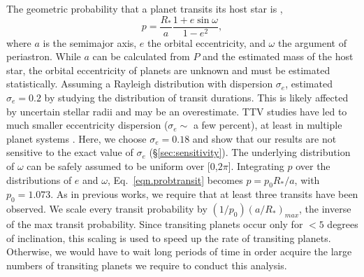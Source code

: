 The geometric probability that a planet transits its host star is
\citep{Winn},
\begin{equation}
\label{eqn.probtransit}
p = \frac{R_*}{a}\frac{1+e \sin \omega}{1-e^2},
\end{equation}
where $a$ is the semimajor axis, $e$ the orbital eccentricity, and
$\omega$ the argument of periastron.  While $a$ can be calculated from
$P$ and the estimated mass of the host star, the orbital eccentricity
of \kep{} planets are unknown and must be estimated statistically.
Assuming a Rayleigh distribution with
  dispersion $\sigma_e$, \citet{Moorhead2011} estimated $\sigma_e =
0.2$ by studying the distribution of transit durations. This
  is likely affected by uncertain stellar radii and may be an
  overestimate. TTV studies have led to much smaller eccentricity
  dispersion ($\sigma_e \sim$ a few percent), at least in multiple
  planet systems \citep{WuLithwick,HaddenLithwick}. Here, we choose
$\sigma_e = 0.18$ and show that our results are not sensitive to the
exact value of $\sigma_e$ (\S \ref{sec:sensitivity}). 
The underlying distribution of $\omega$ can be safely assumed to be
uniform over [0,$2\pi$].  
Integrating $p$ over the distributions of $e$ and $\omega$,
Eq.~\ref{eqn.probtransit} becomes $p = p_0 R_*/a$, with
$p_0=1.073$.  As in previous works, we require that at least three
transits have been observed. 
We scale every transit probability by $(1/p_0)(a/R_*)_{max}$, 
the inverse of the max transit probability. Since transiting planets
occur only for $<5$ degrees of inclination, this scaling is used to speed up
the rate of transiting planets. Otherwise, we would have to wait long 
periods of time in order acquire the large numbers of transiting planets we require
to conduct this analysis. 

